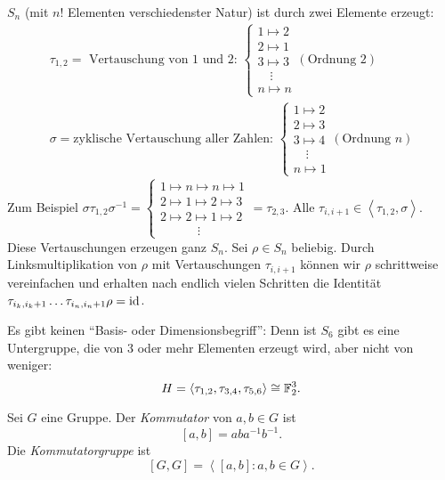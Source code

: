 \begin{eg}
	$S_{n}$ (mit $n!$ Elementen verschiedenster Natur) ist durch zwei Elemente erzeugt:
	\begin{align*}
		\tau_{1,2} = \text{ Vertauschung von $1$ und $2$: } \begin{cases}
			1 \mapsto 2\\ 2 \mapsto 1 \\ 3 \mapsto 3\\ \quad \vdots\\ n \mapsto n
		\end{cases} (\text{Ordnung } 2)\\
		\sigma = \text{zyklische Vertauschung aller Zahlen: } \begin{cases}
			1 \mapsto 2\\ 2 \mapsto 3\\ 3 \mapsto 4 \\ \quad\vdots \\ n\mapsto 1
		\end{cases} (\text{Ordnung } n)
	\end{align*}
	Zum Beispiel $\sigma \tau_{1,2} \sigma^{-1} = \begin{cases}
		1 \mapsto n \mapsto  n \mapsto  1\\
		2  \mapsto 1 \mapsto 2 \mapsto 3\\
		2 \mapsto 2 \mapsto 1 \mapsto 2\\
		\qquad\quad\vdots
	\end{cases} = \tau_{2,3}$. Alle $\tau_{i,i+1} \in \left< \tau_{1,2}, \sigma \right>$.
	Diese Vertauschungen erzeugen ganz $S_{n}$.
	Sei $\rho \in S_{n}$ beliebig. Durch Linksmultiplikation von $\rho$ mit Vertauschungen $\tau_{i,i+1}$ können wir $\rho$ schrittweise vereinfachen
	und erhalten nach endlich vielen Schritten die Identität $\tau_{i_{k},i_{k}+1} \ldots \tau_{i_{n}, i_{n} + 1} \rho = \operatorname{id}$.
\end{eg}

\begin{remark}
	Es gibt keinen \enquote{Basis- oder Dimensionsbegriff}:
	Denn ist $S_{6}$ gibt es eine Untergruppe, die von $3$ oder mehr Elementen erzeugt wird, aber nicht von weniger:
	\[
	H = \left< \tau_{1,2}, \tau_{3,4}, \tau_{5,6} \right> \cong \mathbb{F}_{2}^{3}
	.\] 
\end{remark}

\begin{definition}
	Sei $G$ eine Gruppe. Der \emph{Kommutator} von $a,b \in G$ ist 
	\[
		[a,b] = ab a^{-1} b^{-1}
	.\]
	Die \emph{Kommutatorgruppe} ist
	\[
		[G,G] = \left< [a,b]: a,b \in G \right>
	.\] 
\end{definition}

